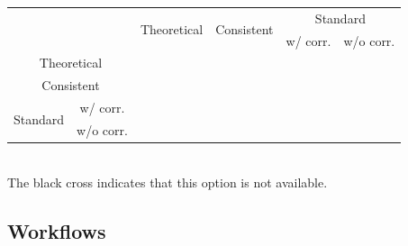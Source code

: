 \documentclass[12pt]{scrartcl}
\newcommand{\cmark}{\ding{51}}%
\newcommand{\xmark}{\ding{55}}%
\begin{document}
\begin{center}
\begin{adjustbox}{max width=\textwidth}
\begin{tabular}{cc|c|c|c|c}
 & & \multirow{2}{*}{Theoretical} & \multirow{2}{*}{Consistent} & \multicolumn{2}{c}{Standard} \\
& & & & w/ corr.& w/o corr. \\
\hline
\multicolumn{2}{c|}{Theoretical} & \textcolor{green}{\cmark} & \textcolor{red}{\xmark} & \textcolor{black}{\xmark} & \textcolor{red}{\xmark} \\
\hline
\multicolumn{2}{c|}{Consistent} & \textcolor{red}{\xmark} & \textcolor{green}{\cmark} & \textcolor{black}{\xmark} & \textcolor{red}{\xmark} \\
\hline
\multirow{2}{*}{Standard} & w/ corr. & \textcolor{black}{\xmark} & \textcolor{black}{\xmark} & \textcolor{black}{\xmark} & \textcolor{black}{\xmark} \\
\cline{2-6}
 & w/o corr. & \textcolor{red}{\xmark} & \textcolor{red}{\xmark} & \textcolor{black}{\xmark} & \textcolor{green}{\cmark} \\
\hline
\end{tabular}
\end{adjustbox}\\[0.2cm]
The black cross \textcolor{black}{\xmark} indicates that this option is not available.
\end{center}

\subsection{Workflows}
\end{document}
